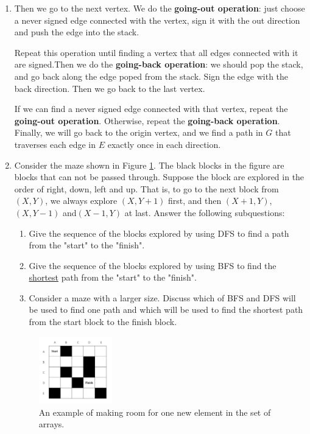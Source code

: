 \documentclass[12pt,a4paper]{article}
\makeatletter
\newtheorem*{solution}{Solution}
\theoremstyle{definition}
\renewenvironment{solution}[1][Solution] {\par\pushQED{\qed}\normalfont\topsep6\p@\@plus6\p@\relax\trivlist\item[\hskip\labelsep\bfseries#1\@addpunct{.}]\ignorespaces}{\popQED\endtrivlist\@endpefalse} \makeatother
\makeatother
\begin{document}
\begin{enumerate}
\begin{solution}
		Then we go to the next vertex. We do the \textbf{going-out operation}: just choose a never signed edge connected with the vertex, sign it with the out direction and push the edge into the stack.

		Repeat this operation until finding a vertex that all edges connected with it are signed.Then we do the \textbf{going-back operation}: we should pop the stack, and go back along the edge poped from the stack. Sign the edge with the back direction. Then we go back to the last vertex.
		
		If we can find a never signed edge connected with that vertex, repeat the \textbf{going-out operation}. Otherwise, repeat the \textbf{going-back operation}. Finally, we will go back to the origin vertex, and we find a path in $ G $ that traverses each edge in $ E $ exactly once in each direction.
	\end{solution}

    \item Consider the maze shown in Figure \ref{Fig-Maze}. The black blocks in the figure are blocks that can not be passed through. Suppose the block are explored in the order of right, down, left and up. That is, to go to the next block from $(X,Y)$, we always explore $(X,Y+1)$ first, and then $(X+1,Y)$,$(X,Y-1)$ and$(X-1,Y)$ at last. Answer the following subquestions:
    \begin{enumerate}
        \item Give the sequence of the blocks explored by using DFS to find a path from the "start" to the "finish".
        \item Give the sequence of the blocks explored by using BFS to find the \underline{shortest} path from the "start" to the "finish".
        \item Consider a maze with a larger size. Discuss which of BFS and DFS will be used to find one path and which will be used to find the shortest path from the start block to the finish block.
    \end{enumerate}
    
    \begin{figure}[H]
	\centering
	\includegraphics[width=0.3\textwidth]{Fig-Maze.pdf}
	\caption{An example of making room for one new element in the set of arrays.}
	\label{Fig-Maze}
	\end{figure}
	

\end{enumerate}
\end{document}

